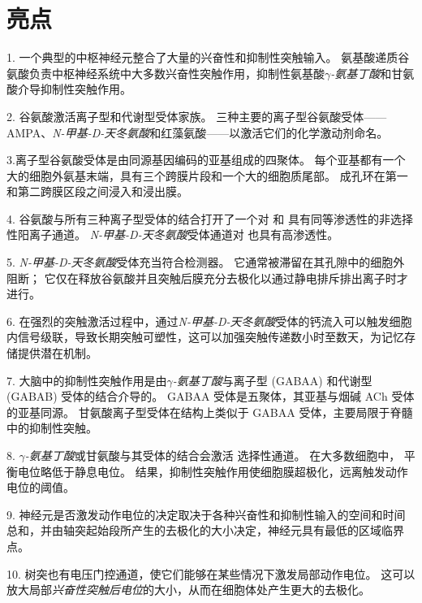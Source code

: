 \section{亮点}

1. 一个典型的中枢神经元整合了大量的兴奋性和抑制性突触输入。
氨基酸递质谷氨酸负责中枢神经系统中大多数兴奋性突触作用，抑制性氨基酸\textit{$\gamma$-氨基丁酸}和甘氨酸介导抑制性突触作用。 


2. 谷氨酸激活离子型和代谢型受体家族。
三种主要的离子型谷氨酸受体——AMPA、\textit{N-甲基-D-天冬氨酸}和红藻氨酸——以激活它们的化学激动剂命名。 


3.离子型谷氨酸受体是由同源基因编码的亚基组成的四聚体。
每个亚基都有一个大的细胞外氨基末端，具有三个跨膜片段和一个大的细胞质尾部。
成孔环在第一和第二跨膜区段之间浸入和浸出膜。 


4. 谷氨酸与所有三种离子型受体的结合打开了一个对  和  具有同等渗透性的非选择性阳离子通道。
\textit{N-甲基-D-天冬氨酸}受体通道对  也具有高渗透性。


5. \textit{N-甲基-D-天冬氨酸}受体充当符合检测器。
它通常被滞留在其孔隙中的细胞外  阻断；
它仅在释放谷氨酸并且突触后膜充分去极化以通过静电排斥排出离子时才进行。 


6. 在强烈的突触激活过程中，通过\textit{N-甲基-D-天冬氨酸}受体的钙流入可以触发细胞内信号级联，导致长期突触可塑性，这可以加强突触传递数小时至数天，为记忆存储提供潜在机制。 


7. 大脑中的抑制性突触作用是由\textit{$\gamma$-氨基丁酸}与离子型 (GABAA) 和代谢型 (GABAB) 受体的结合介导的。
GABAA 受体是五聚体，其亚基与烟碱 ACh 受体的亚基同源。
甘氨酸离子型受体在结构上类似于 GABAA 受体，主要局限于脊髓中的抑制性突触。 


8. \textit{$\gamma$-氨基丁酸}或甘氨酸与其受体的结合会激活  选择性通道。
在大多数细胞中， 平衡电位略低于静息电位。
结果，抑制性突触作用使细胞膜超极化，远离触发动作电位的阈值。 


9. 神经元是否激发动作电位的决定取决于各种兴奋性和抑制性输入的空间和时间总和，并由轴突起始段所产生的去极化的大小决定，神经元具有最低的区域临界点。 


10. 树突也有电压门控通道，使它们能够在某些情况下激发局部动作电位。
这可以放大局部\textit{兴奋性突触后电位}的大小，从而在细胞体处产生更大的去极化。






